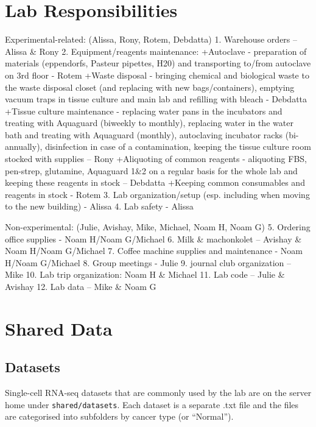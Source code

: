 \documentclass[]{book}
\begin{document}
\chapter{Lab Responsibilities}\label{labResponsibilities}

Experimental-related: (Alissa, Rony, Rotem, Debdatta) 1. Warehouse
orders -- Alissa \& Rony 2. Equipment/reagents maintenance: +Autoclave -
preparation of materials (eppendorfs, Pasteur pipettes, H20) and
transporting to/from autoclave on 3rd floor - Rotem +Waste disposal -
bringing chemical and biological waste to the waste disposal closet (and
replacing with new bags/containers), emptying vacuum traps in tissue
culture and main lab and refilling with bleach - Debdatta +Tissue
culture maintenance - replacing water pans in the incubators and
treating with Aquaguard (biweekly to monthly), replacing water in the
water bath and treating with Aquaguard (monthly), autoclaving incubator
racks (bi-annually), disinfection in case of a contamination, keeping
the tissue culture room stocked with supplies -- Rony +Aliquoting of
common reagents - aliquoting FBS, pen-strep, glutamine, Aquaguard 1\&2
on a regular basis for the whole lab and keeping these reagents in stock
-- Debdatta +Keeping common consumables and reagents in stock - Rotem 3.
Lab organization/setup (esp. including when moving to the new building)
- Alissa 4. Lab safety - Alissa

Non-experimental: (Julie, Avishay, Mike, Michael, Noam H, Noam G) 5.
Ordering office supplies - Noam H/Noam G/Michael 6. Milk \& machonkolet
-- Avishay \& Noam H/Noam G/Michael 7. Coffee machine supplies and
maintenance - Noam H/Noam G/Michael 8. Group meetings - Julie 9. journal
club organization -- Mike 10. Lab trip organization: Noam H \& Michael
11. Lab code -- Julie \& Avishay 12. Lab data -- Mike \& Noam G

\chapter{Shared Data}\label{sharedData}

\section{Datasets}\label{datasets}

Single-cell RNA-seq datasets that are commonly used by the lab are on
the server home under \texttt{shared/datasets}. Each dataset is a
separate .txt file and the files are categorised into subfolders by
cancer type (or ``Normal'').
\end{document}
